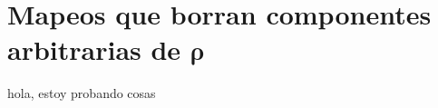 \chapter{Mapeos que borran componentes arbitrarias de 
    $\boldsymbol{\rho}$}
    
hola, estoy probando cosas